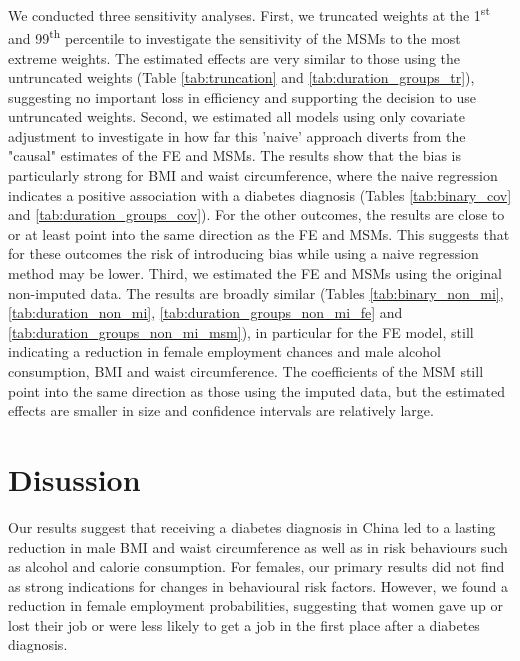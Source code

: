 We conducted three sensitivity analyses. First, we truncated weights at the 1\textsuperscript{st} and 99\textsuperscript{th} percentile to investigate the sensitivity of the \acp{MSM} to the most extreme weights. The estimated effects are very similar to those using the untruncated weights (Table \ref{tab:truncation} and \ref{tab:duration_groups_tr}), suggesting no important loss in efficiency and supporting the decision to use untruncated weights. Second, we estimated all models using only covariate adjustment to investigate in how far this 'naive' approach diverts from the "causal" estimates of the \ac{FE} and \acp{MSM}. The results show that the bias is particularly strong for \ac{BMI} and waist circumference, where the naive regression indicates a positive association with a diabetes diagnosis (Tables \ref{tab:binary_cov} and \ref{tab:duration_groups_cov}). For the other outcomes, the results are close to or at least point into the same direction as the \ac{FE} and \acp{MSM}. This suggests that for these outcomes the risk of introducing bias while using a naive regression method may be lower. Third, we estimated the \ac{FE} and \acp{MSM} using the original non-imputed data. The results are broadly similar (Tables \ref{tab:binary_non_mi}, \ref{tab:duration_non_mi}, \ref{tab:duration_groups_non_mi_fe} and \ref{tab:duration_groups_non_mi_msm}), in particular for the \ac{FE} model, still indicating a reduction in female employment chances and male alcohol consumption, \ac{BMI} and waist circumference. The coefficients of the \ac{MSM} still point into the same direction as those using the imputed data, but the estimated effects are smaller in size and confidence intervals are relatively large.


\FloatBarrier


\section{\label{sec:Discussion5}Disussion}

Our results suggest that receiving a diabetes diagnosis in China led to a lasting reduction in male \ac{BMI} and waist circumference as well as in risk behaviours such as alcohol and calorie consumption. For females, our primary results did not find as strong indications for changes in behavioural risk factors. However, we found a reduction in female employment probabilities, suggesting that women gave up or lost their job or were less likely to get a job in the first place after a diabetes diagnosis.

